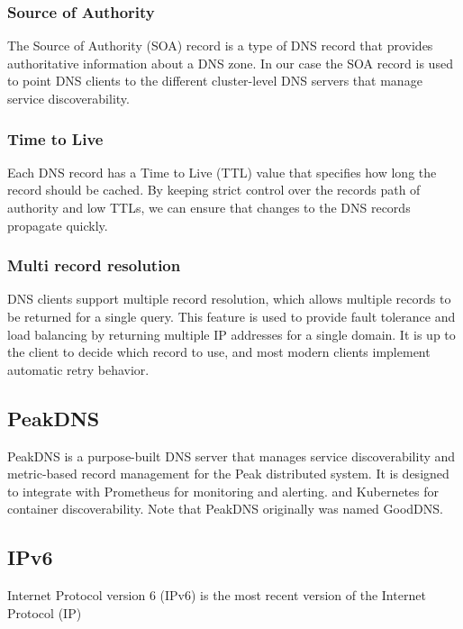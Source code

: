 \documentclass[12pt]{article}
\begin{document}
\subsubsection{Source of Authority}
The Source of Authority (SOA) record is a type of DNS record that provides authoritative information about a DNS zone.
In our case the SOA record is used to point DNS clients to the different cluster-level DNS servers that manage service discoverability.

\subsubsection{Time to Live}
Each DNS record has a Time to Live (TTL) value that specifies how long the record should be cached.
By keeping strict control over the records path of authority and low TTLs, we can ensure that changes to the DNS records propagate quickly.

\subsubsection{Multi record resolution}
DNS clients support multiple record resolution, which allows multiple records to be returned for a single query.
This feature is used to provide fault tolerance and load balancing by returning multiple IP addresses for a single domain.
It is up to the client to decide which record to use, and most modern clients implement automatic retry behavior.

\subsection{PeakDNS}
PeakDNS\cite{heimonenPeakDNS2024} is a purpose-built DNS server that manages service discoverability and 
metric-based record management for the Peak distributed system.
It is designed to integrate with Prometheus for monitoring and alerting.
and Kubernetes for container discoverability.
Note that PeakDNS originally was named GoodDNS.

\subsection{IPv6}
Internet Protocol version 6 (IPv6)\cite{hindenInternetProtocolVersion1998} is the most recent version of the Internet Protocol (IP)
\end{document}
